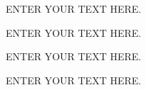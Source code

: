 \documentclass[12pt]{article}
\begin{document}
%
%       
%
\rationaletime          %
ENTER YOUR TEXT HERE.


%
%
\justifyscience         %
ENTER YOUR TEXT HERE.


%
%
\describeobservations   %
ENTER YOUR TEXT HERE.


%
%
\schedulingreqs             %
ENTER YOUR TEXT HERE.

\end{document}
